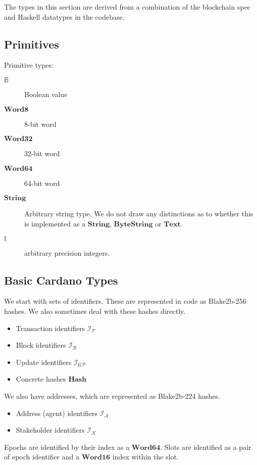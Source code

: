 \documentclass{article}
\newcommand{\idsof}[1]{\mathcal{I}\!_#1}
\newcommand{\txids}{\idsof{\txs}}
\newcommand{\blockids}{\idsof{\blocks}}
\newcommand{\agentids}{\idsof{\agents}}
\newcommand{\updids}{\idsof{\mathcal{UP}}}
\newcommand{\stakeholderids}{\idsof{\mathcal{K}}}
\newcommand{\agents}{\mathcal{A}}
\newcommand{\txs}{\mathcal{T}}
\newcommand{\blocks}{\mathcal{B}}
\newcommand{\hstype}[1]{\textbf{#1}}
\newcommand{\String}{\hstype{String}}
\newcommand{\Word}[1]{\hstype{Word#1}}
\newcommand{\hash}{\hstype{Hash}}
\newcommand{\Integer}{\mathbb{I}}
\newcommand{\Bool}{\mathbb{B}}
\begin{document}
The types in this section are derived from a combination of the blockchain spec
and Haskell datatypes in the codebase.

\subsection{Primitives}

Primitive types:

\begin{description}
\item [$\Bool$] Boolean value
\item [$\Word{8}$] 8-bit word
\item [$\Word{32}$] 32-bit word
\item [$\Word{64}$] 64-bit word
\item [$\String$] Arbitrary string type. We do not draw any distinctions as to
  whether this is implemented as a $\hstype{String}$, $\hstype{ByteString}$ or
  $\hstype{Text}$.
\item [$\Integer$] arbitrary precision integers.
\end{description}

\subsection{Basic Cardano Types}

We start with sets of identifiers. These are represented in code as Blake2b-256
hashes. We also sometimes deal with these hashes directly.

\begin{itemize}
\item{Transaction identifiers $\txids$}
\item{Block identifiers $\blockids$}
\item Update identifiers $\updids$
\item Concrete hashes $\hash$
\end{itemize}

We also have addresses, which are represented as Blake2b-224 hashes.

\begin{itemize}
\item{Address (agent) identifiers $\agentids$}
\item Stakeholder identifiers $\stakeholderids$
\end{itemize}

Epochs are identified by their index as a $\Word{64}$. Slots are identified as a
pair of epoch identifier and a $\Word{16}$ index within the slot.
\end{document}
